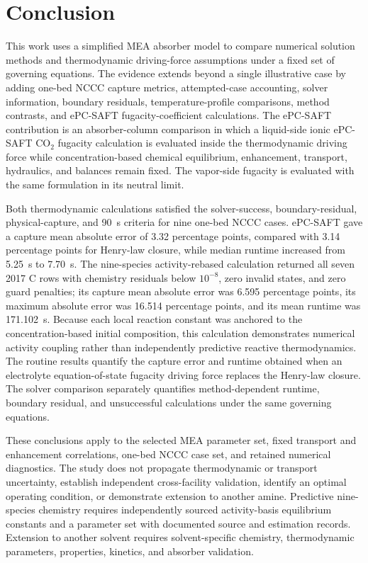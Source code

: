     \section{Conclusion}
        This work uses a simplified MEA absorber model to compare numerical solution methods and thermodynamic driving-force assumptions under a fixed set of governing equations. The evidence extends beyond a single illustrative case by adding one-bed NCCC capture metrics, attempted-case accounting, solver information, boundary residuals, temperature-profile comparisons, method contrasts, and ePC-SAFT fugacity-coefficient calculations. The ePC-SAFT contribution is an absorber-column comparison in which a liquid-side ionic ePC-SAFT CO$_2$ fugacity calculation is evaluated inside the thermodynamic driving force while concentration-based chemical equilibrium, enhancement, transport, hydraulics, and balances remain fixed. The vapor-side fugacity is evaluated with the same formulation in its neutral limit.

        Both thermodynamic calculations satisfied the solver-success, boundary-residual, physical-capture, and \SI{90}{s} criteria for nine one-bed NCCC cases. ePC-SAFT gave a capture mean absolute error of 3.32 percentage points, compared with 3.14 percentage points for Henry-law closure, while median runtime increased from \SI{5.25}{s} to \SI{7.70}{s}. The nine-species activity-rebased calculation returned all seven 2017 C rows with chemistry residuals below $10^{-8}$, zero invalid states, and zero guard penalties; its capture mean absolute error was 6.595 percentage points, its maximum absolute error was 16.514 percentage points, and its mean runtime was \SI{171.102}{s}. Because each local reaction constant was anchored to the concentration-based initial composition, this calculation demonstrates numerical activity coupling rather than independently predictive reactive thermodynamics. The routine results quantify the capture error and runtime obtained when an electrolyte equation-of-state fugacity driving force replaces the Henry-law closure. The solver comparison separately quantifies method-dependent runtime, boundary residual, and unsuccessful calculations under the same governing equations.

        These conclusions apply to the selected MEA parameter set, fixed transport and enhancement correlations, one-bed NCCC case set, and retained numerical diagnostics. The study does not propagate thermodynamic or transport uncertainty, establish independent cross-facility validation, identify an optimal operating condition, or demonstrate extension to another amine. Predictive nine-species chemistry requires independently sourced activity-basis equilibrium constants and a parameter set with documented source and estimation records. Extension to another solvent requires solvent-specific chemistry, thermodynamic parameters, properties, kinetics, and absorber validation.

\clearpage
\nolinenumbers
\raggedbottom
